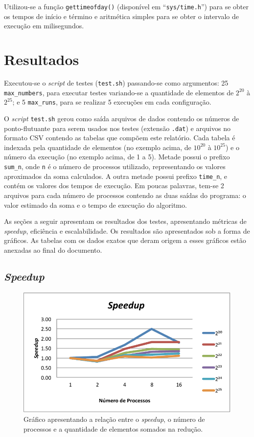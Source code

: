 \documentclass[12pt,a4paper]{article}
\begin{document}
Utilizou-se a função \texttt{gettimeofday()} (disponível em
``\texttt{sys/time.h}'') para se obter os tempos de início e término e
aritmética simples para se obter o intervalo de execução em milisegundos.

\section{Resultados}
\label{sec:resultados}
Executou-se o \textit{script} de testes (\texttt{test.sh}) passando-se como
argumentos: 25 \texttt{max\_numbers}, para executar testes variando-se a
quantidade de elementos de $2^{20}$ à $2^{25}$; e 5 \texttt{max\_runs}, para se
realizar 5 execuções em cada configuração.

O \textit{script} \texttt{test.sh} gerou como saída arquivos de dados contendo
os números de ponto-flutuante para serem usados nos testes (extensão
\texttt{.dat}) e arquivos no formato CSV contendo as tabelas que compõem este
relatório. Cada tabela é indexada pela quantidade de elementos (no exemplo
acima, de $10^{20}$ à $10^{25}$) e o número da execução (no exemplo acima, de 1
a 5). Metade possui o prefixo \texttt{sum\_{n}}, onde \texttt{n} é o número de
processos utilizado, representando os valores aproximados da soma calculados. A
outra metade possui prefixo \texttt{time\_{n}}, e contém os valores dos tempos
de execução.  Em poucas palavras, tem-se 2 arquivos para cada número de
processos contendo as duas saídas do programa: o valor estimado da soma e o
tempo de execução do algoritmo.

As seções a seguir apresentam os resultados dos testes, apresentando métricas de
\textit{speedup}, eficiência e escalabilidade. Os resultados são apresentados
sob a forma de gráficos. As tabelas com os dados exatos que deram origem a esses
gráficos estão anexadas ao final do documento.

\subsection{\textit{Speedup}}
\begin{figure}[h!]
\centering
\includegraphics{img/speedup.pdf}
\caption{Gráfico apresentando a relação entre o \textit{speedup}, o número de
processos e a quantidade de elementos somados na redução.}
\label{fig:speedup}
\end{figure}
\end{document}
